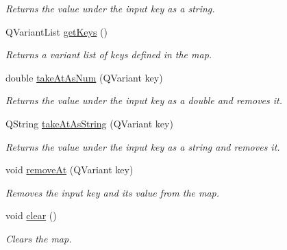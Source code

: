 \begin{DoxyCompactItemize}
\begin{DoxyCompactList}\small\item\em Returns the value under the input key as a string. \end{DoxyCompactList}\item 
Q\-Variant\-List \hyperlink{class_picto_1_1_analysis_variable_map_ac915c7fd3b6be57cb1f9753e87b3281f}{get\-Keys} ()
\begin{DoxyCompactList}\small\item\em Returns a variant list of keys defined in the map. \end{DoxyCompactList}\item 
\hypertarget{class_picto_1_1_analysis_variable_map_a4cafd0b7365f38258bc561400af13450}{double \hyperlink{class_picto_1_1_analysis_variable_map_a4cafd0b7365f38258bc561400af13450}{take\-At\-As\-Num} (Q\-Variant key)}\label{class_picto_1_1_analysis_variable_map_a4cafd0b7365f38258bc561400af13450}

\begin{DoxyCompactList}\small\item\em Returns the value under the input key as a double and removes it. \end{DoxyCompactList}\item 
\hypertarget{class_picto_1_1_analysis_variable_map_ac114415a44fc0ed670f5c16d4cd403b2}{Q\-String \hyperlink{class_picto_1_1_analysis_variable_map_ac114415a44fc0ed670f5c16d4cd403b2}{take\-At\-As\-String} (Q\-Variant key)}\label{class_picto_1_1_analysis_variable_map_ac114415a44fc0ed670f5c16d4cd403b2}

\begin{DoxyCompactList}\small\item\em Returns the value under the input key as a string and removes it. \end{DoxyCompactList}\item 
\hypertarget{class_picto_1_1_analysis_variable_map_af23752d1b5495d1930b0d8eadf7fbd2b}{void \hyperlink{class_picto_1_1_analysis_variable_map_af23752d1b5495d1930b0d8eadf7fbd2b}{remove\-At} (Q\-Variant key)}\label{class_picto_1_1_analysis_variable_map_af23752d1b5495d1930b0d8eadf7fbd2b}

\begin{DoxyCompactList}\small\item\em Removes the input key and its value from the map. \end{DoxyCompactList}\item 
\hypertarget{class_picto_1_1_analysis_variable_map_a5afc768e8884109edb001a70b2a2af09}{void \hyperlink{class_picto_1_1_analysis_variable_map_a5afc768e8884109edb001a70b2a2af09}{clear} ()}\label{class_picto_1_1_analysis_variable_map_a5afc768e8884109edb001a70b2a2af09}

\begin{DoxyCompactList}\small\item\em Clears the map. \end{DoxyCompactList}\end{DoxyCompactItemize}
